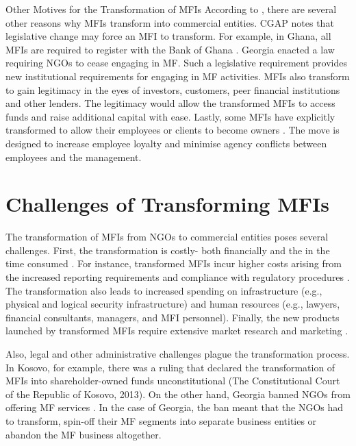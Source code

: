 \documentclass[a4paper,nobind]{templates/ociamthesis}
\begin{document}
\noindent Other Motives for the Transformation of MFIs
According to \textcite{christen2001commercialization}, there are several other reasons why MFIs transform into commercial entities. CGAP notes that legislative change may force an MFI to transform. For example, in Ghana, all MFIs are required to register with the Bank of Ghana \autocite{bankofghana2017}. Georgia enacted a law requiring NGOs to cease engaging in MF. Such a legislative requirement provides new institutional requirements for engaging in MF activities. MFIs also transform to gain legitimacy in the eyes of investors, customers, peer financial institutions and other lenders. The legitimacy would allow the transformed MFIs to access funds and raise additional capital with ease. Lastly, some MFIs have explicitly transformed to allow their employees or clients to become owners \autocite{lauer2008transforming}. The move is designed to increase employee loyalty and minimise agency conflicts between employees and the management.

\hypertarget{challenges-of-transforming-mfis}{%
\section{Challenges of Transforming MFIs}\label{challenges-of-transforming-mfis}}

\noindent The transformation of MFIs from NGOs to commercial entities poses several challenges. First, the transformation is costly- both financially and the in the time consumed \autocite{frank2008stemming}. For instance, transformed MFIs incur higher costs arising from the increased reporting requirements and compliance with regulatory procedures \autocite{meagher2006microfinance}. The transformation also leads to increased spending on infrastructure (e.g., physical and logical security infrastructure) and human resources (e.g., lawyers, financial consultants, managers, and MFI personnel). Finally, the new products launched by transformed MFIs require extensive market research and marketing \autocite{campion1999institutional}.

Also, legal and other administrative challenges plague the transformation process. In Kosovo, for example, there was a ruling that declared the transformation of MFIs into shareholder-owned funds unconstitutional (The Constitutional Court of the Republic of Kosovo, 2013). On the other hand, Georgia banned NGOs from offering MF services \autocite{lauer2008transforming}. In the case of Georgia, the ban meant that the NGOs had to transform, spin-off their MF segments into separate business entities or abandon the MF business altogether.
\end{document}
